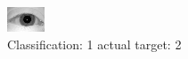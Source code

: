 \begin{figure}[h!]
\begin{center}
\includegraphics[width=0.60\columnwidth]{figures/ID989_class_1_target_2.png}
\end{center}
\caption{ Classification: 1 actual target: 2}
\label{fig:ID989_class_1_target_2}
\end{figure}
